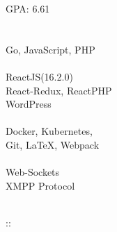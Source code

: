 \documentclass[]{hemant-style}
\begin{document}
\begin{minipage}[]{\textwidth}
\begin{minipage}{\textwidth}
\begin{minipage}[t][][c]{.25\textwidth}
                            GPA: 6.61\\
                             \newline
                             \\
                            \\
                            Go, 
                            JavaScript, PHP\\
                            \\
                            ReactJS(16.2.0) \\React-Redux, ReactPHP\\
                            WordPress\\
                            \\
                            Docker, Kubernetes,\\
                            Git, \LaTeX, Webpack\\
                            \\
                            Web-Sockets \\XMPP Protocol\\
                            \vspace{1em}
                        \end{minipage}
                        \begin{minipage}[t][][c]{.75\textwidth}
                             \\
                            ::\\

\end{minipage}
\end{minipage}
\end{minipage}
\end{document}
